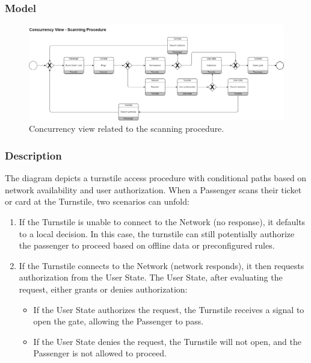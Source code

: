 \subsubsection{Model}
\begin{figure}[H]
    \centering
    \includegraphics[width=\textwidth]{drawings/views_final_version/concurrency_view_2.png}
    \caption{Concurrency view related to the scanning procedure.}
    \label{fig:concurrency_view_2}
\end{figure}

\subsubsection{Description}
The diagram depicts a turnstile access procedure with conditional paths based on network availability and user authorization. When a Passenger scans their ticket or card at the Turnstile, two scenarios can unfold:

\begin{enumerate}
    \item If the Turnstile is unable to connect to the Network (no response), it defaults to a local decision. In this case, the turnstile can still potentially authorize the passenger to proceed based on offline data or preconfigured rules.
    \item If the Turnstile connects to the Network (network responds), it then requests authorization from the User State. The User State, after evaluating the request, either grants or denies authorization:
    \begin{itemize}
        \item If the User State authorizes the request, the Turnstile receives a signal to open the gate, allowing the Passenger to pass.
        \item If the User State denies the request, the Turnstile will not open, and the Passenger is not allowed to proceed.
    \end{itemize}
\end{enumerate}

